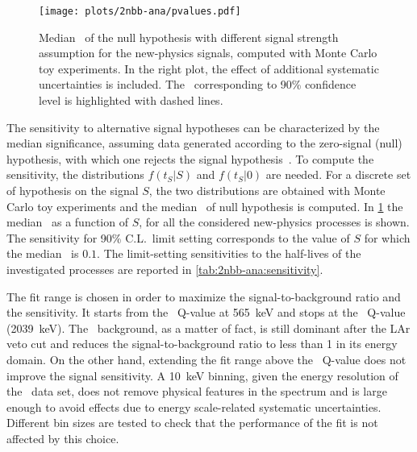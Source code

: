 \begin{figure}
  \centering
  \texttt{[image: plots/2nbb-ana/pvalues.pdf]}
  \caption{%
    Median \pvalue\ of the null hypothesis with different signal strength assumption for
    the new-physics signals, computed with Monte Carlo toy experiments. In the right
    plot, the effect of additional systematic uncertainties is included. The \pvalue\
    corresponding to 90\% confidence level is highlighted with dashed lines.
  }\label{fig:2nbb-ana:pvalues}
\end{figure}

The sensitivity to alternative signal hypotheses can be characterized by the median
significance, assuming data generated according to the zero-signal (null) hypothesis, with
which one rejects the signal hypothesis~\cite{Cowan2011}. To compute the sensitivity, the
distributions $f(t_S|S)$ and $f(t_S|0)$ are needed. For a discrete set of hypothesis on
the signal $S$, the two distributions are obtained with Monte Carlo toy experiments and
the median \pvalue\ of null hypothesis is computed. In \cref{fig:2nbb-ana:pvalues} the
median \pvalue\ as a function of $S$, for all the considered new-physics processes is
shown. The sensitivity for 90\% C.L.~limit setting corresponds to the value of $S$ for
which the median \pvalue\ is $0.1$. The limit-setting sensitivities to the half-lives of
the investigated processes are reported in \cref{tab:2nbb-ana:sensitivity}.

The fit range is chosen in order to maximize the signal-to-background ratio and the
sensitivity. It starts from the \Arl\ Q-value at 565~keV and stops at the \nnbb\ Q-value
(2039~keV). The \Arl\ background, as a matter of fact, is still dominant after the LAr
veto cut and reduces the signal-to-background ratio to less than 1 in its energy domain.
On the other hand, extending the fit range above the \nnbb\ Q-value does not improve the
signal sensitivity.
\newpar
A 10~keV binning, given the energy resolution of the \enrBEGeII\ data set, does not
remove physical features in the spectrum and is large enough to avoid effects due to
energy scale-related systematic uncertainties. Different bin sizes are tested
to check that the performance of the fit is not affected by this choice.

\begin{table}
  \centering
  \caption{%
    Sensitivity for 90\% C.L.~limit setting on the half-lives of new physics processes
    contributing to the \nnbb\ event distribution, before and after the inclusion of
    systematic uncertainties. The results are extracted from toy Monte Carlo data sets.
  }\label{tab:2nbb-ana:sensitivity}
  
\end{table}

